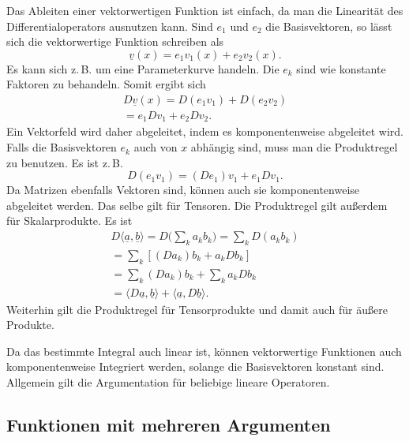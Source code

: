 \documentclass[a4paper,11pt,fleqn,twocolumn,twoside]{scrartcl}
\numberwithin{equation}{section}
\begin{document}
Das Ableiten einer vektorwertigen Funktion ist einfach, da man
die Linearität des Differentialoperators ausnutzen kann. Sind $e_1$
und $e_2$ die Basisvektoren, so lässt sich die vektorwertige
Funktion schreiben als
\begin{equation}
\underline v(x) = e_1v_1(x)+e_2v_2(x).
\end{equation}
Es kann sich z.\,B. um eine Parameterkurve handeln. Die $e_k$ sind
wie konstante Faktoren zu behandeln. Somit ergibt sich
\begin{gather*}
D\underline v(x) = D(e_1v_1)+D(e_2v_2)\\
= e_1Dv_1+e_2Dv_2.
\end{gather*}
Ein Vektorfeld wird daher abgeleitet, indem es komponentenweise
abgeleitet wird. Falls die Basisvektoren $e_k$
auch von $x$ abhängig sind, muss man die Produktregel zu benutzen.
Es ist z.\,B.
\begin{equation}
D(e_1v_1) = (De_1)v_1+e_1Dv_1.
\end{equation}
Da Matrizen ebenfalls Vektoren sind, können auch sie komponentenweise
abgeleitet werden. Das selbe gilt für Tensoren. Die Produktregel
gilt außerdem für Skalarprodukte. Es ist
\begin{gather*}D\langle\underline a,\underline b\rangle
= D\Big(\sum\nolimits_k a_kb_k\Big) = \sum\nolimits_k D(a_kb_k)\\
= \sum\nolimits_k [(Da_k)b_k+a_kDb_k]\\
= \sum\nolimits_k (Da_k)b_k + \sum\nolimits_k a_kDb_k\\
= \langle D\underline a,\underline b\rangle
+ \langle \underline a,D\underline b\rangle.
\end{gather*}
Weiterhin gilt die Produktregel für Tensorprodukte und damit auch
für äußere Produkte.

Da das bestimmte Integral auch linear ist, können vektorwertige
Funktionen auch komponentenweise Integriert werden, solange die
Basisvektoren konstant sind. Allgemein gilt die Argumentation für
beliebige lineare Operatoren.


\subsection[Funktionen mit mehreren Argumenten]
{Funktionen mit mehreren\newline
Argumenten}
\end{document}
